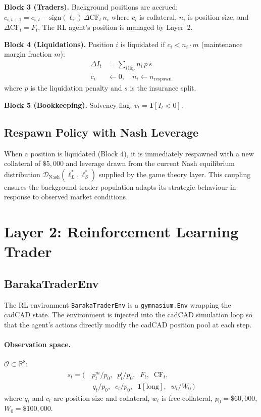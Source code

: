 \documentclass[10pt,twocolumn]{article}
\theoremstyle{plain}
\theoremstyle{definition}
\newcommand{\R}{\mathbb{R}}
\begin{document}
\textbf{Block 3 (Traders).}  Background positions are accrued:
$c_{i,t+1} = c_{i,t} - \mathrm{sign}(\ell_i)\,\Delta\mathrm{CF}_t\,n_i$
where $c_i$ is collateral, $n_i$ is position size, and
$\Delta\mathrm{CF}_t = F_t$.  The RL agent's position is
managed by Layer~2.

\textbf{Block 4 (Liquidations).}  Position $i$ is liquidated if
$c_i < n_i \cdot m$ (maintenance margin fraction $m$):
\begin{align}
  \Delta I_t &= \sum_{i\,\mathrm{liq.}} n_i\,p\,s \\
  c_i &\leftarrow 0, \quad n_i \leftarrow n_{\mathrm{respawn}}
\end{align}
where $p$ is the liquidation penalty and $s$ is the
insurance split.

\textbf{Block 5 (Bookkeeping).}  Solvency flag:
$v_t = \mathbf{1}[I_t < 0]$.

\subsection{Respawn Policy with Nash Leverage}

When a position is liquidated (Block 4), it is immediately
respawned with a new collateral of $\$5{,}000$ and leverage
drawn from the current Nash equilibrium distribution
$\mathcal{D}_{\mathrm{Nash}}(\ell^*_L, \ell^*_S)$ supplied
by the game theory layer.  This coupling ensures the
background trader population adapts its strategic behaviour
in response to observed market conditions.

\section{Layer 2: Reinforcement Learning Trader}
\label{sec:rl}

\subsection{BarakaTraderEnv}

The RL environment \texttt{BarakaTraderEnv} is a
\texttt{gymnasium.Env} wrapping the cadCAD state.
The environment is injected into the cadCAD simulation
loop so that the agent's actions directly modify the
cadCAD position pool at each step.

\paragraph{Observation space.}  $\mathcal{O} \subset \R^8$:
\begin{align}
  s_t = \big(&\,p^m_t/p_0,\;\; p^i_t/p_0,\;\;
               F_t,\;\; \mathrm{CF}_t, \nonumber\\
             &\; q_t/p_0,\;\; c_t/p_0,\;\;
               \mathbf{1}[\text{long}],\;\; w_t/W_0\,\big)
\end{align}
where $q_t$ and $c_t$ are position size and collateral,
$w_t$ is free collateral, $p_0 = \$60{,}000$,
$W_0 = \$100{,}000$.
\end{document}
